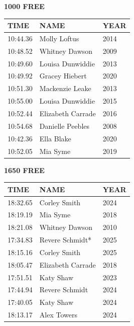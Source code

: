 \begin{table}[H]
\centering
\begin{minipage}[t]{0.48\textwidth}
\centering
\textbf{1000 FREE}\\[0.1cm]
\begin{tabular}{@{}p{1.8cm}p{2.8cm}p{1.2cm}@{}}
\hline
    \textbf{TIME} & \textbf{NAME} & \textbf{YEAR} \\
\hline
    10:44.36 & Molly Loftus & 2014 \\
    10:48.52 & Whitney Dawson & 2009 \\
    10:49.60 & Louisa Dunwiddie & 2013 \\
    10:49.92 & Gracey Hiebert & 2020 \\
    10:51.30 & Mackenzie Leake & 2013 \\
    10:55.00 & Louisa Dunwiddie & 2015 \\
    10:52.44 & Elizabeth Carrade & 2016 \\
    10:54.68 & Danielle Peebles & 2008 \\
    10:42.36 & Ella Blake & 2020 \\
    10:52.05 & Mia Syme & 2019 \\
\hline
\end{tabular}
\end{minipage}\hfill
\begin{minipage}[t]{0.48\textwidth}
\centering
\textbf{1650 FREE}\\[0.1cm]
\begin{tabular}{@{}p{1.8cm}p{2.8cm}p{1.2cm}@{}}
\hline
    \textbf{TIME} & \textbf{NAME} & \textbf{YEAR} \\
\hline
    18:32.65 & Corley Smith & 2024 \\
    18:19.19 & Mia Syme & 2018 \\
    18:21.08 & Whitney Dawson & 2010 \\
    17:34.83 & Revere Schmidt* & 2025 \\
    18:15.16 & Corley Smith & 2025 \\
    18:05.47 & Elizabeth Carrade & 2018 \\
    17:51.51 & Katy Shaw & 2023 \\
    17:44.94 & Revere Schmidt & 2024 \\
    17:40.05 & Katy Shaw & 2024 \\
    18:13.17 & Alex Towers & 2024 \\
\hline
\end{tabular}
\end{minipage}
\end{table}


